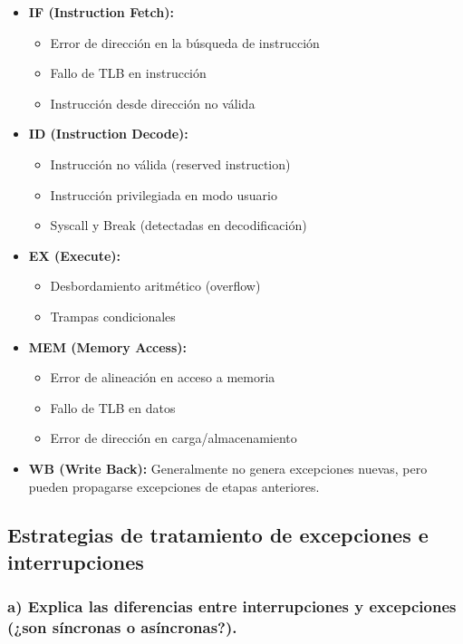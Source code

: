 \documentclass[12pt]{article}
\begin{document}
\begin{itemize}
	\item \textbf{IF (Instruction Fetch):}
	\begin{itemize}
		\item Error de dirección en la búsqueda de instrucción
		\item Fallo de TLB en instrucción
		\item Instrucción desde dirección no válida
	\end{itemize}
	
	\item \textbf{ID (Instruction Decode):}
	\begin{itemize}
		\item Instrucción no válida (reserved instruction)
		\item Instrucción privilegiada en modo usuario
		\item Syscall y Break (detectadas en decodificación)
	\end{itemize}
	
	\item \textbf{EX (Execute):}
	\begin{itemize}
		\item Desbordamiento aritmético (overflow)
		\item Trampas condicionales
	\end{itemize}
	
	\item \textbf{MEM (Memory Access):}
	\begin{itemize}
		\item Error de alineación en acceso a memoria
		\item Fallo de TLB en datos
		\item Error de dirección en carga/almacenamiento
	\end{itemize}
	
	\item \textbf{WB (Write Back):} Generalmente no genera excepciones nuevas, pero pueden propagarse excepciones de etapas anteriores.
\end{itemize}

\subsection{Estrategias de tratamiento de excepciones e interrupciones}

\subsubsection{a) Explica las diferencias entre interrupciones y excepciones (¿son síncronas o asíncronas?).}
\end{document}
